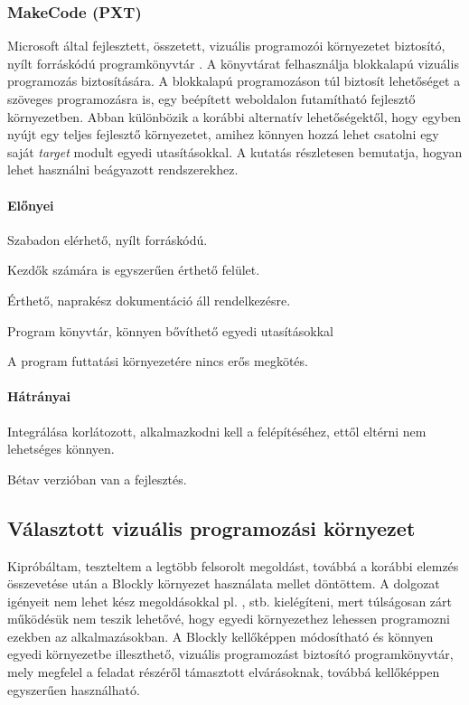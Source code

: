 \documentclass[12pt,a4paper,oneside]{report} %
\begin{document}
\subsubsection{MakeCode (PXT)}
\label{pxt}
Microsoft által fejlesztett, összetett, vizuális programozói környezetet biztosító, nyílt forráskódú programkönyvtár \cite{seneviratne2019makecode}. A  könyvtárat felhasználja blokkalapú vizuális programozás biztosítására. A blokkalapú programozáson túl biztosít lehetőséget a szöveges programozásra is, egy beépített weboldalon futamítható fejlesztő környezetben. Abban különbözik a korábbi alternatív lehetőségektől, hogy egyben nyújt egy teljes fejlesztő környezetet, amihez könnyen hozzá lehet csatolni egy saját \textit{target} modult egyedi utasításokkal. A \cite{devine2018makecode} kutatás részletesen bemutatja, hogyan lehet használni beágyazott rendszerekhez.
\paragraph{Előnyei} 
\begin{compactitem}
	\item Szabadon elérhető, nyílt forráskódú.
	\item Kezdők számára is egyszerűen érthető felület.
	\item Érthető, naprakész dokumentáció áll rendelkezésre.
	\item Program könyvtár, könnyen bővíthető egyedi utasításokkal
	\item A program futtatási környezetére nincs erős megkötés.
\end{compactitem}
\paragraph{Hátrányai} 
\begin{compactitem}
	\item Integrálása korlátozott, alkalmazkodni kell a felépítéséhez, ettől eltérni nem lehetséges könnyen.
	\item Bétav verzióban van a fejlesztés.
\end{compactitem}

\subsection{Választott vizuális programozási környezet}
Kipróbáltam, teszteltem a legtöbb felsorolt megoldást, továbbá a korábbi elemzés összevetése  után a Blockly környezet használata mellet döntöttem.
A dolgozat igényeit nem lehet kész megoldásokkal pl. ,  stb. kielégíteni, mert túlságosan zárt működésük nem teszik lehetővé, hogy egyedi környezethez lehessen programozni ezekben az alkalmazásokban.
A Blockly kellőképpen módosítható és könnyen egyedi környezetbe illeszthető, vizuális programozást biztosító programkönyvtár, mely megfelel a feladat részéről támasztott elvárásoknak, továbbá kellőképpen egyszerűen használható.
\end{document}
